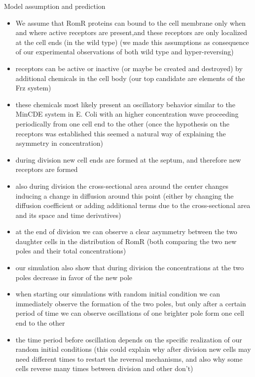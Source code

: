 \documentclass{amsart}
\theoremstyle{plain}
\numberwithin{equation}{section}
\begin{document}
Model assumption and prediction\\
\begin{itemize}
\item We assume that RomR proteins can bound to the cell membrane only when and where active receptors are present,and these receptors are only localized at the cell ends (in the wild type) (we made this assumptions as consequence of our experimental observations of both wild type and hyper-reversing)
\item receptors can be active or inactive (or maybe be created and destroyed) by additional chemicals in the cell body (our top candidate are elements of the Frz system)
\item these chemicals most likely present an oscillatory behavior similar to the MinCDE system in E. Coli with an higher concentration wave proceeding periodically from one cell end to the other (once the hypothesis on the receptors was established this seemed a natural way of explaining the asymmetry in concentration)
\item during division new cell ends are formed at the septum, and therefore new receptors are formed
\item also during division the cross-sectional area around the center changes inducing a change in diffusion around this point (either by changing the diffusion coefficient or adding additional terms due to the cross-sectional area and its space and time derivatives)
\item at the end of division we can observe a clear asymmetry between the two daughter cells in the distribution of RomR (both comparing the two new poles and their total concentrations)
\item our simulation also show that during division the concentrations at the two poles decrease in favor of the new pole
\item when starting our simulations with random initial condition we can immediately observe the formation of the two poles, but only after a certain period of time we can observe oscillations of one brighter pole form one cell end to the other
\item the time period before oscillation depends on the specific realization of our random initial conditions (this could explain why after division new cells may need different times to restart the reversal mechanisms, and also why some cells reverse many times between division and other don't) 
\end{itemize}
\end{document}
